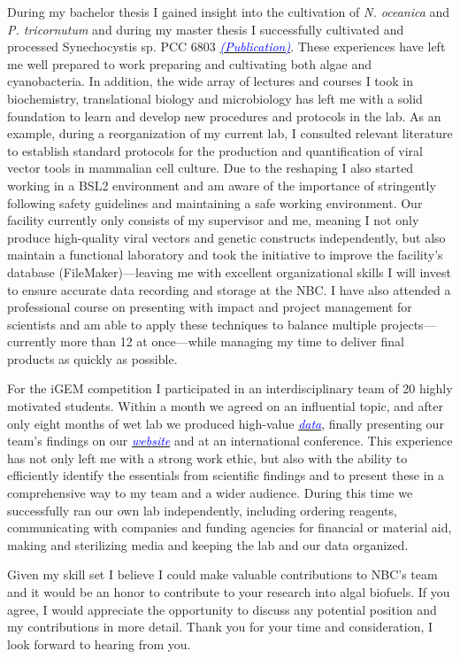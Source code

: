 \documentclass[11pt,a4paper,sans]{moderncv}
\begin{document}
\begin{spacing}{1.15}
During my bachelor thesis I gained insight into the cultivation of \textit{N. oceanica} and \textit{P. tricornutum} and during my master thesis I successfully cultivated and processed Synechocystis sp. PCC 6803 {\href{https://www.ncbi.nlm.nih.gov/pubmed/29517395}{\textcolor{blue}{{\textit{(Publication)}}}}}. 
These experiences have left me well prepared to work preparing and cultivating both algae and cyanobacteria. 
In addition, the wide array of lectures and courses I took in biochemistry, translational biology and microbiology has  left me with a solid foundation to learn and develop new procedures and protocols in the lab. 
As an example, during a reorganization of my current lab, I consulted relevant literature to establish standard protocols for the production and quantification of viral vector tools in mammalian cell culture. 
Due to the reshaping I also started working in a BSL2 environment and am aware of the importance of stringently following safety guidelines and maintaining a safe working environment. 
Our facility currently only consists of my supervisor and me, meaning I not only produce high-quality viral vectors and genetic constructs independently, but also maintain a functional laboratory and took the initiative to improve the facility's database (FileMaker)---leaving me with excellent organizational skills I will invest to ensure accurate data recording and storage at the NBC.  
I have also attended a professional course on presenting with impact and project management for scientists and am able to apply these techniques to balance multiple projects---currently more than 12 at once---while managing my time to deliver final products as quickly as possible.  \par%

For the iGEM competition I participated in an interdisciplinary team of 20 highly motivated students.
Within a month we agreed on an influential topic, and after only eight months of wet lab we produced high-value  {\href{https://www.ncbi.nlm.nih.gov/pubmed/29803867}{\textcolor{blue}{\textit{data}}}}, finally presenting our team's findings on our {\href{http://2015.igem.org/Team:Freiburg}{\textcolor{blue}{\textit{website}}}} and at an international conference. 
This experience has not only left me with a strong work ethic, but also with the ability to efficiently identify the essentials from scientific findings and to present these in a comprehensive way to my team and a wider audience. 
During this time we successfully ran our own lab independently, including ordering reagents, communicating with companies and funding agencies for financial or material aid, making and sterilizing media and keeping the lab and our data organized. \par

Given my skill set I believe I could make valuable contributions to NBC's team and it would be an honor to contribute to your research into algal biofuels. 
If you agree, I would appreciate the opportunity to discuss any potential position and my contributions in more detail. 
Thank you for your time and consideration, I look forward to hearing from you.


 

\end{spacing}
\makeletterclosing
\end{document}
